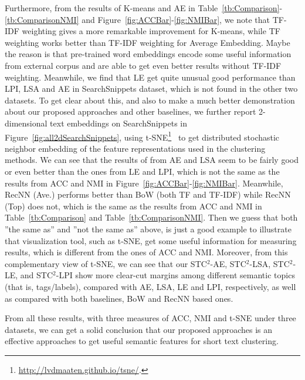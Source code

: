 \documentclass[review]{elsarticle}
\begin{document}
Furthermore, from the results of K-means and AE in Table~\ref{tb:Comparison}-\ref{tb:ComparisonNMI} and Figure~\ref{fig:ACCBar}-\ref{fig:NMIBar}, we note that TF-IDF weighting gives a more remarkable improvement for K-means, while TF weighting works better than TF-IDF weighting for Average Embedding. Maybe the reason is that pre-trained word embeddings encode some useful information from external corpus and are able to get even better results without TF-IDF weighting. Meanwhile, we find that LE get quite unusual good performance than LPI, LSA and AE in SearchSnippets dataset, which is not found in the other two datasets. To get clear about this, and also to make a much better demonstration about our proposed approaches and other baselines, we further report 2-dimensional text embeddings on SearchSnippets in Figure~\ref{fig:all2dSearchSnippets}, using t-SNE\footnote{\url{http://lvdmaaten.github.io/tsne/}.}~\cite{39_van2008visualizing} to get distributed stochastic neighbor embedding of the feature representations used in the clustering methods.
We can see that the results of from AE and LSA seem to be fairly good or even better than the ones from LE and LPI, which is not the same as the results from ACC and NMI in Figure~\ref{fig:ACCBar}-\ref{fig:NMIBar}. Meanwhile, RecNN (Ave.) performs better than BoW (both TF and TF-IDF) while RecNN (Top) does not, which is the same as the results from ACC and NMI in Table~\ref{tb:Comparison} and Table~\ref{tb:ComparisonNMI}. Then we guess that both ''the same as'' and ''not the same as'' above, is just a good example to illustrate that visualization tool, such as t-SNE, get some useful information for measuring results, which is different from the ones of ACC and NMI. Moreover, from this complementary view of t-SNE, we can see that our STC$^2$-AE, STC$^2$-LSA, STC$^2$-LE, and STC$^2$-LPI show more clear-cut margins among different semantic topics (that is, tags/labels), compared with AE, LSA, LE and LPI, respectively, as well as compared with both baselines, BoW and RecNN based ones.

From all these results, with three measures of ACC, NMI and t-SNE under three datasets, we can get a solid conclusion that our proposed approaches is an effective approaches to get useful semantic features for short text clustering.
\end{document}
